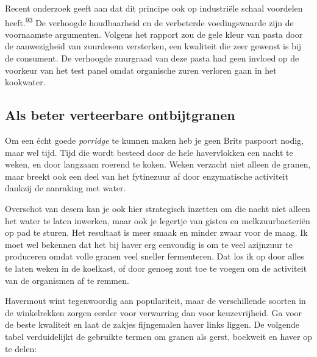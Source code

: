 \documentclass[
  11pt,
  dutch,
]{memoir}
\begin{document}
Recent onderzoek geeft aan dat dit principe ook op industriële schaal
voordelen heeft.\textsuperscript{93} De verhoogde houdbaarheid en de
verbeterde voedingswaarde zijn de voornaamste argumenten. Volgens het
rapport zou de gele kleur van pasta door de aanwezigheid van zuurdesem
versterken, een kwaliteit die zeer gewenst is bij de consument. De
verhoogde zuurgraad van deze pasta had geen invloed op de voorkeur van
het test panel omdat organische zuren verloren gaan in het kookwater.

\hypertarget{als-beter-verteerbare-ontbijtgranen}{%
\subsection{Als beter verteerbare
ontbijtgranen}\label{als-beter-verteerbare-ontbijtgranen}}

Om een écht goede \emph{porridge} te kunnen maken heb je geen Brits
paspoort nodig, maar wel tijd. Tijd die wordt besteed door de hele
havervlokken een nacht te weken, en door langzaam roerend te koken.
Weken verzacht niet alleen de granen, maar breekt ook een deel van het
fytinezuur af door enzymatische activiteit dankzij de aanraking met
water.

Overschot van desem kan je ook hier strategisch inzetten om die nacht
niet alleen het water te laten inwerken, maar ook je legertje van gisten
en melkzuurbacteriën op pad te sturen. Het resultaat is meer smaak en
minder zwaar voor de maag. Ik moet wel bekennen dat het bij haver erg
eenvoudig is om te veel azijnzuur te produceren omdat volle granen veel
sneller fermenteren. Dat los ik op door alles te laten weken in de
koelkast, of door genoeg zout toe te voegen om de activiteit van de
organismen af te remmen.

Havermout wint tegenwoordig aan populariteit, maar de verschillende
soorten in de winkelrekken zorgen eerder voor verwarring dan voor
keuzevrijheid. Ga voor de beste kwaliteit en laat de zakjes fijngemalen
haver links liggen. De volgende tabel verduidelijkt de gebruikte termen
om granen als gerst, boekweit en haver op te delen:
\end{document}
